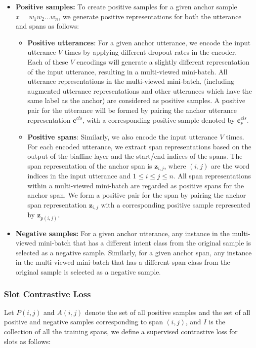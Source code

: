 \documentclass{ecai}
\begin{document}
\begin{itemize}
    \item \textbf{Positive samples:} To create positive samples for a given anchor sample $x = w_1 w_2 \ldots w_n$, we generate positive representations for both the utterance and spans as follows:

    \begin{itemize}
        \item \textbf{Positive utterances}: For a given anchor utterance, we encode the input utterance $V$ times by applying different dropout rates in the encoder. Each of these $V$ encodings will generate a slightly different representation of the input utterance, resulting in a multi-viewed mini-batch. All utterance representations in the multi-viewed mini-batch, (including augmented utterance representations and other utterances which have the same label as the anchor) are considered as positive samples. A positive pair for the utterance will be formed by pairing the anchor utterance representation $\textbf{c}^{cls}$, with a corresponding positive sample denoted by $\textbf{c}^{cls}_p$.

        \item \textbf{Positive spans}: Similarly, we also encode the input utterance $V$ times. For each encoded utterance, we extract span representations based on the output of the biaffine layer and the start/end indices of the spans. The span representation of the anchor span is $\textbf{z}_{i,j}$, where $(i,j)$ are the word indices in the input utterance and $1 \leq i \leq j \leq n$. All span representations within a multi-viewed mini-batch are regarded as positive spans for the anchor span. We form a positive pair for the span by pairing the anchor span representation $\textbf{z}_{i,j}$ with a corresponding positive sample represented by $\textbf{z}_{p(i,j)}$.
        
    \end{itemize} 

    \item \textbf{Negative samples:} For a given anchor utterance, any instance in the multi-viewed mini-batch that has a different intent class from the original sample is selected as a negative sample. Similarly, for a given anchor span, any instance in the multi-viewed mini-batch that has a different span class from the original sample is selected as a negative sample.
\end{itemize}


\subsubsection{Slot Contrastive Loss}
Let $P(i,j)$ and $A(i,j)$ denote the set of all positive samples and the set of all positive and negative samples corresponding to span $(i,j)$, and $I$ is the collection of all the training spans, we define a supervised contrastive loss for slots as follows:
\end{document}
